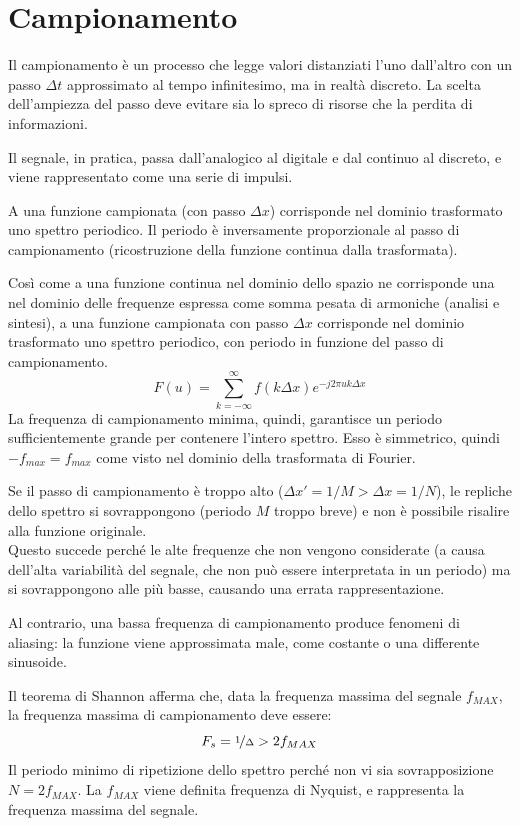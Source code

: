 \section{Campionamento}
Il campionamento è un processo che legge valori distanziati l'uno dall'altro con un passo $\Delta t$ approssimato al tempo infinitesimo, ma in realtà discreto. La scelta dell'ampiezza del passo deve evitare sia lo spreco di risorse che la perdita di informazioni.

Il segnale, in pratica, passa dall'analogico al digitale e dal continuo al discreto, e viene rappresentato come una serie di impulsi.

A una funzione campionata (con passo $\Delta x$) corrisponde nel dominio trasformato uno spettro periodico. Il periodo è inversamente proporzionale al passo di campionamento (ricostruzione della funzione continua dalla trasformata).

Così come a una funzione continua nel dominio dello spazio ne corrisponde una nel dominio delle frequenze espressa come somma pesata di armoniche (analisi e sintesi), a una funzione campionata con passo $\Delta x$ corrisponde nel dominio trasformato uno spettro periodico, con periodo in funzione del passo di campionamento.
$$F(u) = \sum_{k=-\infty}^{\infty} f(k\Delta x)e^{-j2\pi uk \Delta x}$$
La frequenza di campionamento minima, quindi, garantisce un periodo sufficientemente grande per contenere l'intero spettro. Esso è simmetrico, quindi $-f_{max} = f_{max}$ come visto nel dominio della trasformata di Fourier.

Se il passo di campionamento è troppo alto ($\Delta x' = 1/M > \Delta x = 1/N$), le repliche dello spettro si sovrappongono (periodo $M$ troppo breve) e non è possibile risalire alla funzione originale. \\
Questo succede perché le alte frequenze che non vengono considerate (a causa dell'alta variabilità del segnale, che non può essere interpretata in un periodo) ma si sovrappongono alle più basse, causando una errata rappresentazione.

Al contrario, una bassa frequenza di campionamento produce fenomeni di aliasing: la funzione viene approssimata male, come costante o una differente sinusoide.

Il teorema di Shannon afferma che, data la frequenza massima del segnale $f_{MAX}$, la frequenza massima di campionamento deve essere:
$$F_s = \nicefrac{1}{\Delta} > 2f_{MAX}$$
Il periodo minimo di ripetizione dello spettro perché non vi sia sovrapposizione $N = 2f_{MAX}$. La $f_{MAX}$ viene definita frequenza di Nyquist, e rappresenta la frequenza massima del segnale.

